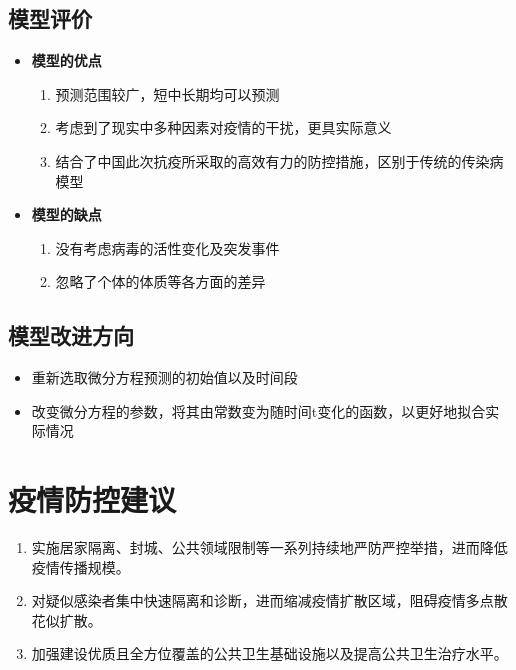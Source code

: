 \documentclass[UTF8]{ctexart}
\begin{document}
		\subsection{模型评价}
		
		\begin{itemize}
   		\setlength{\parsep}{0ex} %
	    \setlength{\topsep}{2ex} %
    	\setlength{\itemsep}{1ex} %
			\item \textbf{模型的优点}
			\begin{enumerate}[(1)]
			\item 预测范围较广，短中长期均可以预测
			\item 考虑到了现实中多种因素对疫情的干扰，更具实际意义
			\item 结合了中国此次抗疫所采取的高效有力的防控措施，区别于传统的传染病模型
			\end{enumerate}
			\item \textbf{模型的缺点}
			\begin{enumerate}[(1)]
			\item 没有考虑病毒的活性变化及突发事件
			\item 忽略了个体的体质等各方面的差异
			\end{enumerate}			
		\end{itemize}	
		\subsection{模型改进方向}
		\begin{itemize}
		\item 重新选取微分方程预测的初始值以及时间段
		\item 改变微分方程的参数，将其由常数变为随时间t变化的函数，以更好地拟合实际情况
		\end{itemize}
		
\section{疫情防控建议}
		\begin{enumerate}[1)]
 	\item 实施居家隔离、封城、公共领域限制等一系列持续地严防严控举措，进而降低疫情传播规模。
  	\item 对疑似感染者集中快速隔离和诊断，进而缩减疫情扩散区域，阻碍疫情多点散花似扩散。
  	\item 加强建设优质且全方位覆盖的公共卫生基础设施以及提高公共卫生治疗水平。
  
		\end{enumerate}		
\end{document}
